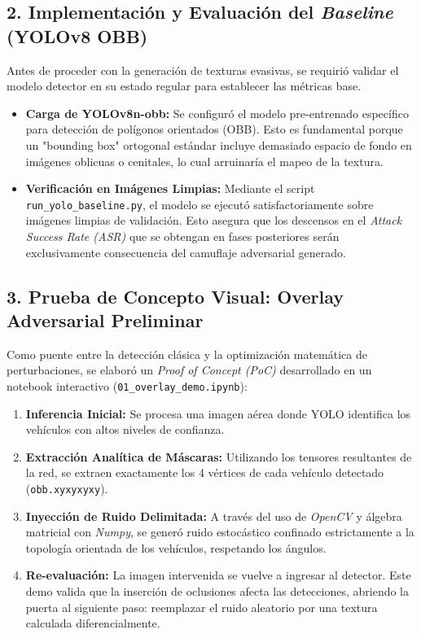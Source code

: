 \documentclass[12pt,a4paper]{article}
\begin{document}
\subsection{2. Implementación y Evaluación del \textit{Baseline} (YOLOv8 OBB)}
Antes de proceder con la generación de texturas evasivas, se requirió validar el modelo detector en su estado regular para establecer las métricas base.
\begin{itemize}
    \item \textbf{Carga de YOLOv8n-obb:} Se configuró el modelo pre-entrenado específico para detección de polígonos orientados (OBB). Esto es fundamental porque un "bounding box" ortogonal estándar incluye demasiado espacio de fondo en imágenes oblicuas o cenitales, lo cual arruinaría el mapeo de la textura.
    \item \textbf{Verificación en Imágenes Limpias:} Mediante el script \texttt{run\_yolo\_baseline.py}, el modelo se ejecutó satisfactoriamente sobre imágenes limpias de validación. Esto asegura que los descensos en el \textit{Attack Success Rate (ASR)} que se obtengan en fases posteriores serán exclusivamente consecuencia del camuflaje adversarial generado.
\end{itemize}

\subsection{3. Prueba de Concepto Visual: Overlay Adversarial Preliminar}
Como puente entre la detección clásica y la optimización matemática de perturbaciones, se elaboró un \textit{Proof of Concept (PoC)} desarrollado en un notebook interactivo (\texttt{01\_overlay\_demo.ipynb}):
\begin{enumerate}
    \item \textbf{Inferencia Inicial:} Se procesa una imagen aérea donde YOLO identifica los vehículos con altos niveles de confianza.
    \item \textbf{Extracción Analítica de Máscaras:} Utilizando los tensores resultantes de la red, se extraen exactamente los 4 vértices de cada vehículo detectado (\texttt{obb.xyxyxyxy}).
    \item \textbf{Inyección de Ruido Delimitada:} A través del uso de \textit{OpenCV} y álgebra matricial con \textit{Numpy}, se generó ruido estocástico confinado estrictamente a la topología orientada de los vehículos, respetando los ángulos.
    \item \textbf{Re-evaluación:} La imagen intervenida se vuelve a ingresar al detector. Este demo valida que la inserción de oclusiones afecta las detecciones, abriendo la puerta al siguiente paso: reemplazar el ruido aleatorio por una textura calculada diferencialmente.
\end{enumerate}
\end{document}
